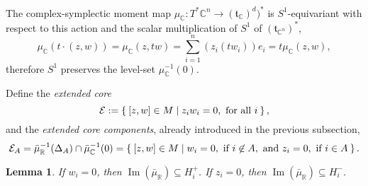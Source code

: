 \documentclass{amsart}
\newtheorem{lemma}[theorem]{Lemma}
\newcommand{\ra}{\rightarrow}
\newcommand{\RR}{\mathbb{R}}
\newcommand{\CC}{\mathbb{C}}
\newcommand{\mcE}{\mathcal{E}}
\newcommand{\mft}{\mathfrak{t}}
\DeclareMathOperator{\Image}{Im}
\begin{document}
	The complex-symplectic moment map $\mu_{\CC} : T^{\ast}\CC^{n} \ra (\mft_{\CC})^{d})^{\ast}$ is $S^{1}$-equivariant with respect to this action and the scalar multiplication of $S^{1}$ of $(\mft_{\CC^{n}})^{\ast}$,
		\[
		\mu_{\CC}\left(t\cdot(z,w)\right) = \mu_{\CC}(z,tw) = \sum_{i=1}^{n}\left(z_{i}(tw_{i})\right)e_{i} = t\mu_{\CC}(z,w),
		\]
	therefore $S^{1}$ preserves the level-set $\mu_{\CC}^{-1}(0)$. 
	
	Define the \emph{extended core}
	\[
		\mcE := \Set{[z,w] \in M | z_{i}w_{i} = 0, \text{ for all } i },
	\]
	and the \emph{extended core components}, already introduced in the previous subsection,
	\[
		\mcE_{A} = \bar{\mu}_{\RR}^{-1}(\Delta_{A})\cap \bar{\mu}_{\CC}^{-1}(0) = \Set{[z,w] \in M | w_{i} = 0, \text{ if } i \not\in A, \text{ and } z_{i} = 0, \text{ if } i \in A}.
	\]
	\begin{lemma}
		If $w_{i} = 0$, then $\Image(\bar{\mu}_{\RR}) \subseteq H_{i}^{+}$. If $z_{i} = 0$, then $\Image(\bar{\mu}_{\RR}) \subseteq H_{i}^{-}$.
	\end{lemma}
	
\end{document}
